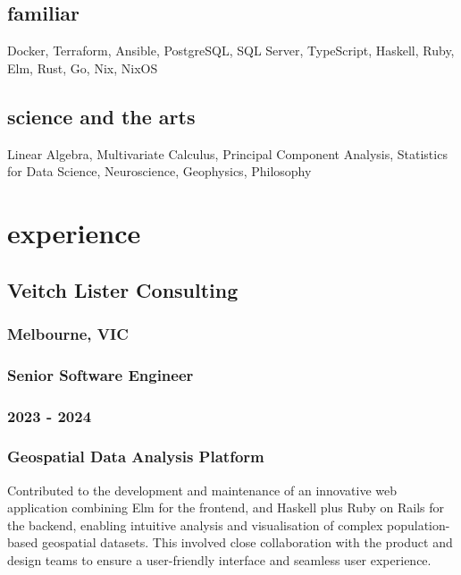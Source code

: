 \documentclass{article}
\begin{document}
\subsection{ familiar }

Docker, Terraform, Ansible, PostgreSQL, SQL Server, TypeScript, Haskell, Ruby, Elm, Rust, Go, Nix, NixOS

\subsection{ science and the arts }

Linear Algebra, Multivariate Calculus, Principal Component Analysis, Statistics for Data Science, Neuroscience, Geophysics, Philosophy

\section{ experience }

\subsection{ Veitch Lister Consulting }

\subsubsection{ Melbourne, VIC }

\subsubsection{ Senior Software Engineer }

\subsubsection{ 2023 - 2024 }

\subsubsection{ Geospatial Data Analysis Platform }

Contributed to the development and maintenance of an innovative web application combining Elm for the frontend, and Haskell plus Ruby on Rails for the backend, enabling intuitive analysis and visualisation of complex population-based geospatial datasets. This involved close collaboration with the product and design teams to ensure a user-friendly interface and seamless user experience.
\end{document}
